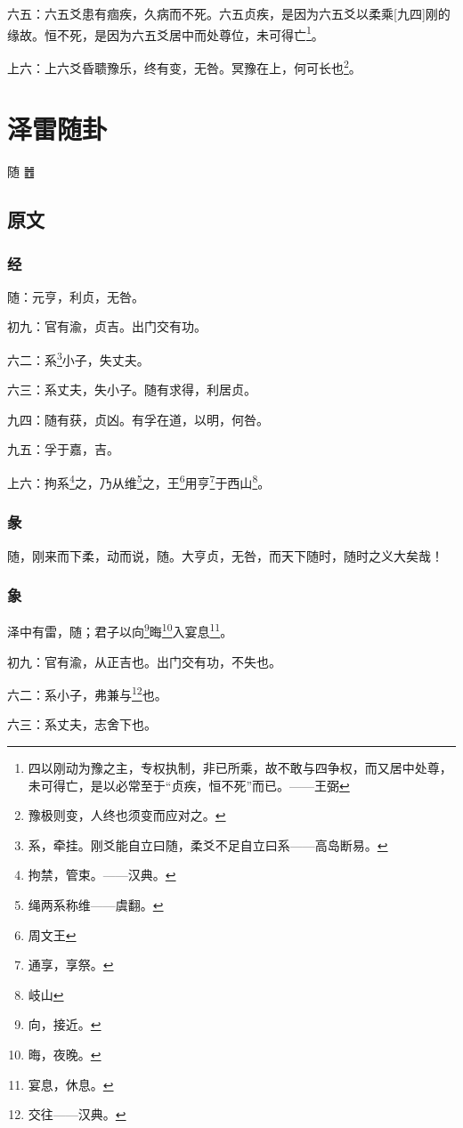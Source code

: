 \documentclass[12pt,oneside]{book}
\begin{document}
六五：六五爻患有痼疾，久病而不死。六五贞疾，是因为六五爻以柔乘[九四]刚的缘故。恒不死，是因为六五爻居中而处尊位，未可得亡\footnote{四以刚动为豫之主，专权执制，非已所乘，故不敢与四争权，而又居中处尊，未可得亡，是以必常至于“贞疾，恒不死”而已。——王弼}。

上六：上六爻昏聩豫乐，终有变，无咎。冥豫在上，何可长也\footnote{豫极则变，人终也须变而应对之。}。



\chapter{泽雷随卦}
随 {\Large ䷐}

\section{原文}

\subsection{经}
随：元亨，利贞，无咎。

初九：官有渝，贞吉。出门交有功。

六二：系\footnote{系，牵挂。刚爻能自立曰随，柔爻不足自立曰系——高岛断易。}小子，失丈夫。

六三：系丈夫，失小子。随有求得，利居贞。

九四：随有获，贞凶。有孚在道，以明，何咎。

九五：孚于嘉，吉。

上六：拘系\footnote{拘禁，管束。——汉典。}之，乃从维\footnote{绳两系称维——虞翻。}之，王\footnote{周文王}用亨\footnote{通享，享祭。}于西山\footnote{岐山}。

\subsection{彖}
随，刚来而下柔，动而说，随。大亨贞，无咎，而天下随时，随时之义大矣哉！

\subsection{象}
泽中有雷，随；君子以向\footnote{向，接近。}晦\footnote{晦，夜晚。}入宴息\footnote{宴息，休息。}。

初九：官有渝，从正吉也。出门交有功，不失也。

六二：系小子，弗兼与\footnote{交往——汉典。}也。

六三：系丈夫，志舍下也。
\end{document}
